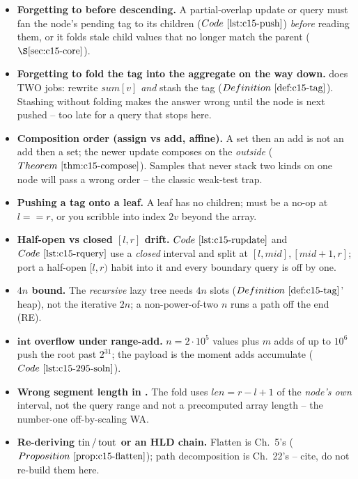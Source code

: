 \begin{itemize}[nosep, leftmargin=1.4em]
  \item \textbf{Forgetting to  before descending.} A partial-overlap
        update or query must fan the node's pending tag to its children
        (\(\coderef{c15-push}\)) \emph{before} reading them, or it folds stale child
        values that no longer match the parent (\(\secref{c15-core}\)).
  \item \textbf{Forgetting to fold the tag into the aggregate on the way down.}
         does TWO jobs: rewrite \(\mathit{sum}[v]\) \emph{and} stash the
        tag (\(\defref{c15-tag}\)). Stashing without folding makes the answer wrong
        until the node is next pushed -- too late for a query that stops here.
  \item \textbf{Composition order (assign vs add, affine).} A set then an add is not
        an add then a set; the newer update composes on the \emph{outside}
        (\(\thmref{c15-compose}\)). Samples that never stack two kinds on one node
        will pass a wrong order -- the classic weak-test trap.
  \item \textbf{Pushing a tag onto a leaf.} A leaf has no children;  must
        be a no-op at \(l==r\), or you scribble into index \(2v\) beyond the array.
  \item \textbf{Half-open vs closed \([l,r]\) drift.} \(\coderef{c15-rupdate}\) and
        \(\coderef{c15-rquery}\) use a \emph{closed} interval and split at
        \([l,mid],[mid{+}1,r]\); port a half-open \([l,r)\) habit into it and every
        boundary query is off by one.
  \item \textbf{\(4n\) bound.} The \emph{recursive} lazy tree needs \(4n\) slots
        (\(\defref{c15-tag}\)' heap), not the iterative \(2n\); a non-power-of-two
        \(n\) runs a path off the end (RE).
  \item \textbf{\(\mathbf{int}\) overflow under range-add.} \(n=2\cdot10^5\) values
        plus \(m\) adds of up to \(10^6\) push the root past \(2^{31}\); the payload
        is  the moment adds accumulate (\(\coderef{c15-295-soln}\)).
  \item \textbf{Wrong segment length in .} The fold uses
        \(\mathit{len}=r-l+1\) of the \emph{node's own} interval, not the query range
        and not a precomputed array length -- the number-one off-by-scaling WA.
  \item \textbf{Re-deriving \(\operatorname{tin}/\operatorname{tout}\) or an HLD chain.} Flatten is Ch.~5's
        (\(\propref{c15-flatten}\)); path decomposition is Ch.~22's -- cite, do not
        re-build them here.
\end{itemize}

